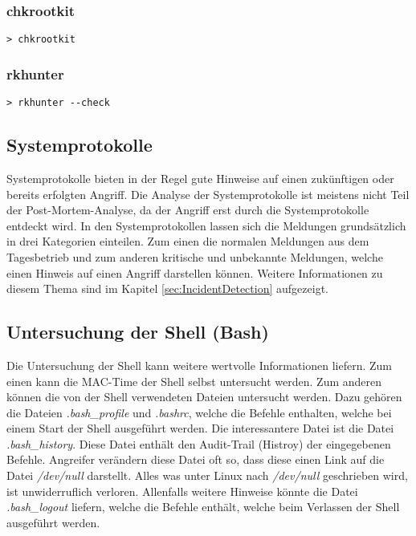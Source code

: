 \subsubsection{chkrootkit}
\begin{lstlisting}
> chkrootkit
\end{lstlisting}

\subsubsection{rkhunter}
\begin{lstlisting}
> rkhunter --check
\end{lstlisting}


\subsection{Systemprotokolle}
Systemprotokolle bieten in der Regel gute Hinweise auf einen zukünftigen oder bereits erfolgten Angriff. Die Analyse der Systemprotokolle ist meistens nicht Teil der Post-Mortem-Analyse, da der Angriff erst durch die Systemprotokolle entdeckt wird. In den Systemprotokollen lassen sich die Meldungen grundsätzlich in drei Kategorien einteilen. Zum einen die normalen Meldungen aus dem Tagesbetrieb und zum anderen kritische und unbekannte Meldungen, welche einen Hinweis auf einen Angriff darstellen können. Weitere Informationen zu diesem Thema sind im Kapitel \ref{sec:IncidentDetection}  aufgezeigt.



\subsection{Untersuchung der Shell (Bash)}
Die Untersuchung der Shell kann weitere wertvolle Informationen liefern. Zum einen kann die MAC-Time der Shell selbst untersucht werden. Zum anderen können die von der Shell verwendeten Dateien untersucht werden. Dazu gehören die Dateien \textit{.bash\_profile} und \textit{.bashrc}, welche die Befehle enthalten, welche bei einem Start der Shell ausgeführt werden. Die interessantere Datei ist die Datei \textit{.bash\_history}. Diese Datei enthält den Audit-Trail (Histroy) der eingegebenen Befehle. Angreifer verändern diese Datei oft so, dass diese einen Link auf die Datei \textit{/dev/null} darstellt. Alles was unter Linux nach \textit{/dev/null} geschrieben wird, ist unwiderruflich verloren. Allenfalls weitere Hinweise könnte die Datei \textit{.bash\_logout} liefern, welche die Befehle enthält, welche beim Verlassen der Shell ausgeführt werden.


